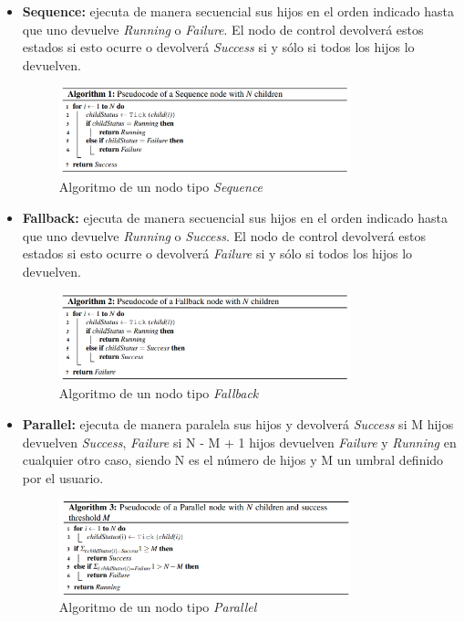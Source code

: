 \begin{itemize}
    \item \textbf{Sequence:} ejecuta de manera secuencial sus hijos en el orden indicado hasta que uno devuelve \textit{Running} o \textit{Failure}. El nodo de control devolverá estos estados si esto ocurre o devolverá \textit{Success} si y sólo si todos los hijos lo devuelven.

    \begin{figure}[H]
        \centering
        \includegraphics[width=0.8\textwidth]{figures/fundamentos/alg1.png}
        \caption{Algoritmo de un nodo tipo \textit{Sequence}}
        \label{fig:sequence}
    \end{figure}

    \item \textbf{Fallback:} ejecuta de manera secuencial sus hijos en el orden indicado hasta que uno devuelve \textit{Running} o \textit{Success}. El nodo de control devolverá estos estados si esto ocurre o devolverá \textit{Failure} si y sólo si todos los hijos lo devuelven.

    \begin{figure}[H]
        \centering
        \includegraphics[width=0.8\textwidth]{figures/fundamentos/alg2.png}
        \caption{Algoritmo de un nodo tipo \textit{Fallback}}
        \label{fig:fallback}
    \end{figure}

    \item \textbf{Parallel:} ejecuta de manera paralela sus hijos y devolverá \textit{Success} si M hijos devuelven \textit{Success}, \textit{Failure} si N - M + 1 hijos devuelven \textit{Failure} y \textit{Running} en cualquier otro caso, siendo N es el número de hijos y M un umbral definido por el usuario.

    \begin{figure}[H]
        \centering
        \includegraphics[width=0.8\textwidth]{figures/fundamentos/alg3.png}
        \caption{Algoritmo de un nodo tipo \textit{Parallel}}
        \label{fig:parallel}
    \end{figure}


\end{itemize}
